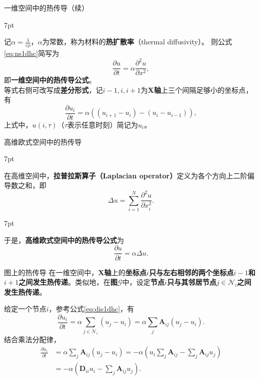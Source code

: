 \documentclass{beamer}
\newenvironment{formal}{%
	\def\FrameCommand{%
		\hspace{1pt}%
		{\color{deepgreen}\vrule width 2pt}%
		{\color{greenshade}\vrule width 4pt}%
		\colorbox{greenshade}%
	}%
	\MakeFramed{\advance\hsize-\width\FrameRestore}%
	\noindent\hspace{-4.55pt}%
	\begin{adjustwidth}{}{7pt}%
		\vspace{2pt}\vspace{2pt}%
	}
	{%
		\vspace{2pt}
	\end{adjustwidth}\endMakeFramed%
}
\begin{document}
\begin{frame}{一维空间中的热传导（续）}
	\begin{formal}
		记$\alpha=\frac{\lambda}{c\rho}$，$\alpha$为常数，称为材料的\textbf{热扩散率}（thermal diffusivity）。
		则公式\ref{eq:ns1dhc}简写为
		\begin{equation}
			\frac{\partial u}{\partial t}=\alpha\frac{\partial^2 u}{\partial x^2},
		\end{equation}
		即{\color{red}\textbf{一维空间中的热传导公式}}。\\
		等式右侧可改写成{\color{red}\textbf{差分形式}}，记$i-1,i,i+1$为\textbf{X轴}上三个间隔足够小的坐标点，有
		\begin{equation}
			\label{eq:dis1dhc}
			\frac{\partial u_i}{\partial t}=\alpha\left(\left(u_{i+1}-u_i\right)-\left(u_i-u_{i-1}\right)\right),
		\end{equation}
		上式中，$u\left(i,\tau\right)$（$\tau$表示任意时刻）简记为$u_i$。
	\end{formal}
\end{frame}

\begin{frame}{高维欧式空间中的热传导}
	\begin{formal}
		在高维空间中，{\color{red}\textbf{拉普拉斯算子（Laplacian operator）}}定义为各个方向上二阶偏导数之和，即
		\begin{equation}
			\Delta u=\sum\limits_{i=1}^N\frac{\partial^2u}{\partial x_i^2}.
		\end{equation}
	\end{formal}
	\begin{formal}
		于是，{\color{red}\textbf{高维欧式空间中的热传导公式}}为
		\begin{equation}
			\frac{\partial u}{\partial t}=\alpha\Delta u.
		\end{equation}
	\end{formal}
\end{frame}

\begin{frame}{图上的热传导}
	在一维空间中，\textbf{X轴}上的{\color{red}\textbf{坐标点$i$只与左右相邻的两个坐标点$i-1$和$i+1$之间发生热传递}}。类似地，在\textbf{图$\mathscr{G}$}中，设定{\color{red}\textbf{节点$i$只与其邻居节点$j\in\mathcal{N}_i$之间发生热传递}}。
	
	给定一个节点$i$，参考公式\ref{eq:dis1dhc}，有
	\begin{equation}
		\label{eq:tcgraph}
		\frac{\partial u_i}{\partial t}=\alpha\sum\limits_{j\in\mathcal{N}_i}\left(u_j-u_i\right)=\alpha\sum\limits_j\textbf{A}_{ij}\left(u_j-u_i\right).
	\end{equation}
	结合乘法分配律，
	\begin{equation}
		\label{eq:shcg}
		\begin{aligned}
			\frac{\partial u_i}{\partial t}&=\alpha\sum\limits_j\textbf{A}_{ij}\left(u_j-u_i\right)
			=-\alpha\left(u_i\sum\limits_j\textbf{A}_{ij}-\sum\limits_j\textbf{A}_{ij}u_j\right)\\
			&=-\alpha\left(\textbf{D}_{ii}u_i-\sum\limits_j\textbf{A}_{ij}u_j\right).
		\end{aligned}
	\end{equation}
\end{frame}
\end{document}
